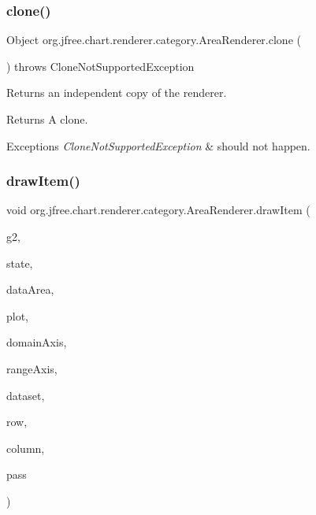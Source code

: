 \subsubsection{\texorpdfstring{clone()}{clone()}}
{\footnotesize\ttfamily Object org.\+jfree.\+chart.\+renderer.\+category.\+Area\+Renderer.\+clone (\begin{DoxyParamCaption}{ }\end{DoxyParamCaption}) throws Clone\+Not\+Supported\+Exception}

Returns an independent copy of the renderer.

\begin{DoxyReturn}{Returns}
A clone.
\end{DoxyReturn}

\begin{DoxyExceptions}{Exceptions}
{\em Clone\+Not\+Supported\+Exception} & should not happen. \\
\hline
\end{DoxyExceptions}
\mbox{\label{classorg_1_1jfree_1_1chart_1_1renderer_1_1category_1_1_area_renderer_ab82b9b680daac05d897107edf19fe843}} 
\subsubsection{\texorpdfstring{draw\+Item()}{drawItem()}}
{\footnotesize\ttfamily void org.\+jfree.\+chart.\+renderer.\+category.\+Area\+Renderer.\+draw\+Item (\begin{DoxyParamCaption}\item[{Graphics2D}]{g2,  }\item[{\mbox{\hyperlink{classorg_1_1jfree_1_1chart_1_1renderer_1_1category_1_1_category_item_renderer_state}{Category\+Item\+Renderer\+State}}}]{state,  }\item[{Rectangle2D}]{data\+Area,  }\item[{\mbox{\hyperlink{classorg_1_1jfree_1_1chart_1_1plot_1_1_category_plot}{Category\+Plot}}}]{plot,  }\item[{\mbox{\hyperlink{classorg_1_1jfree_1_1chart_1_1axis_1_1_category_axis}{Category\+Axis}}}]{domain\+Axis,  }\item[{\mbox{\hyperlink{classorg_1_1jfree_1_1chart_1_1axis_1_1_value_axis}{Value\+Axis}}}]{range\+Axis,  }\item[{\mbox{\hyperlink{interfaceorg_1_1jfree_1_1data_1_1category_1_1_category_dataset}{Category\+Dataset}}}]{dataset,  }\item[{int}]{row,  }\item[{int}]{column,  }\item[{int}]{pass }\end{DoxyParamCaption})}

